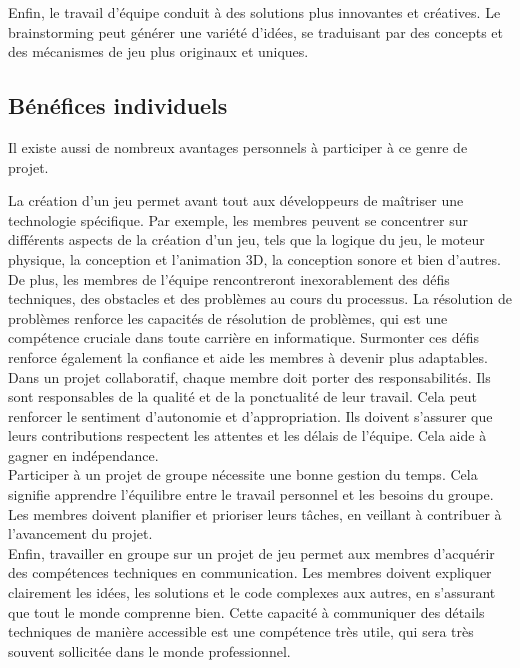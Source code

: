\documentclass{article}
\begin{document}
Enfin, le travail d’équipe conduit à des solutions plus innovantes et créatives. Le brainstorming peut générer une variété d’idées, se traduisant par des concepts et des mécanismes de jeu plus originaux et uniques.





\subsection{Bénéfices individuels}\hfill

Il existe aussi de nombreux avantages personnels à participer à ce genre de projet.

La création d’un jeu permet avant tout aux développeurs de maîtriser une technologie spécifique. Par exemple, les membres peuvent se concentrer sur différents aspects de la création d'un jeu, tels que la logique du jeu, le moteur physique, la conception et l'animation 3D, la conception sonore et bien d'autres.\\

De plus, les membres de l’équipe rencontreront inexorablement des défis techniques, des obstacles et des problèmes au cours du processus. La résolution de problèmes renforce les capacités de résolution de problèmes, qui est une compétence cruciale dans toute carrière en informatique. Surmonter ces défis renforce également la confiance et aide les membres à devenir plus adaptables.\\

Dans un projet collaboratif, chaque membre doit porter des responsabilités. Ils sont responsables de la qualité et de la ponctualité de leur travail. Cela peut renforcer le sentiment d’autonomie et d’appropriation. Ils doivent s’assurer que leurs contributions respectent les attentes et les délais de l’équipe. Cela aide à gagner en indépendance.\\

Participer à un projet de groupe nécessite une bonne gestion du temps. Cela signifie apprendre l’équilibre entre le travail personnel et les besoins du groupe. Les membres doivent planifier et prioriser leurs tâches, en veillant à contribuer à l’avancement du projet.\\

Enfin, travailler en groupe sur un projet de jeu permet aux membres d'acquérir des compétences techniques en communication. Les membres doivent expliquer clairement les idées, les solutions et le code complexes aux autres, en s'assurant que tout le monde comprenne bien. Cette capacité à communiquer des détails techniques de manière accessible est une compétence très utile,  qui sera très souvent sollicitée dans le monde professionnel.
\end{document}
